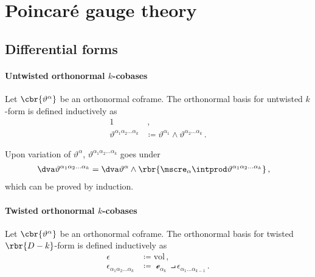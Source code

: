\documentclass[a4paper]{article}
\begin{document}
\section{Poincaré gauge theory}


\subsection{Differential forms}


\paragraph{Untwisted orthonormal $k$-cobases}
Let $\cbr{\vartheta^{\alpha}}$ be an orthonormal coframe. The orthonormal 
basis for untwisted $k$-form is defined inductively as
\begin{align}
1&\,, \\
\vartheta^{\alpha_{1}\alpha_{2}\ldots \alpha_{k}} &\coloneqq 
	\vartheta^{\alpha_{1}} \wedge \vartheta^{\alpha_{2}\ldots \alpha_{k}}\,.
\end{align}

Upon variation of $\vartheta^{\alpha}$, $\vartheta^{\alpha_{1}\alpha_{2}\ldots 
\alpha_{k}}$ goes under
\begin{align}
\dva \vartheta^{\alpha_{1}\alpha_{2}\ldots \alpha_{k}} &=
\dva \vartheta^{\alpha} \wedge \rbr{\mscre_{\alpha}\intprod 
	\vartheta^{\alpha_{1}\alpha_{2}\ldots \alpha_{k}}}\,,
\end{align}
which can be proved by induction.

\paragraph{Twisted orthonormal $k$-cobases}
Let $\cbr{\vartheta^{\alpha}}$ be an orthonormal coframe. The orthonormal 
basis for twisted $\rbr{D-k}$-form is defined inductively as
\begin{align}
\epsilon &\coloneqq \mathrm{vol}\,, \\
\epsilon_{\alpha_{1}\alpha_{2}\ldots \alpha_{k}} &\coloneqq
\mscre_{\alpha_{k}} \intprod \epsilon_{\alpha_{1}\ldots \alpha_{k-1}}\,.
\end{align}
\end{document}
